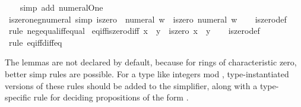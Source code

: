 \begin{isabellebody}
%
\isadelimproof
\ \ %
\endisadelimproof
%
\isatagproof
{}\isamarkupfalse%
\ {\isacharparenleft}{\kern0pt}simp\ add{\isacharcolon}{\kern0pt}\ numeral{\isacharunderscore}{\kern0pt}One{\isacharparenright}{\kern0pt}%
\endisatagproof
{\isafoldproof}%
%
\isadelimproof
\isanewline
%
\endisadelimproof
\isanewline
{}\isamarkupfalse%
\ iszero{\isacharunderscore}{\kern0pt}neg{\isacharunderscore}{\kern0pt}numeral\ {\isacharbrackleft}{\kern0pt}simp{\isacharbrackright}{\kern0pt}{\isacharcolon}{\kern0pt}\ {\isachardoublequoteopen}iszero\ {\isacharparenleft}{\kern0pt}{\isacharminus}{\kern0pt}\ numeral\ w{\isacharparenright}{\kern0pt}\ {\isasymlongleftrightarrow}\ iszero\ {\isacharparenleft}{\kern0pt}numeral\ w{\isacharparenright}{\kern0pt}{\isachardoublequoteclose}\isanewline
%
\isadelimproof
\ \ %
\endisadelimproof
%
\isatagproof
{}\isamarkupfalse%
\ iszero{\isacharunderscore}{\kern0pt}def\ \isamarkupfalse%
\ {\isacharparenleft}{\kern0pt}rule\ neg{\isacharunderscore}{\kern0pt}equal{\isacharunderscore}{\kern0pt}{}{\isacharunderscore}{\kern0pt}iff{\isacharunderscore}{\kern0pt}equal{\isacharparenright}{\kern0pt}%
\endisatagproof
{\isafoldproof}%
%
\isadelimproof
\isanewline
%
\endisadelimproof
\isanewline
{}\isamarkupfalse%
\ eq{\isacharunderscore}{\kern0pt}iff{\isacharunderscore}{\kern0pt}iszero{\isacharunderscore}{\kern0pt}diff{\isacharcolon}{\kern0pt}\ {\isachardoublequoteopen}x\ {\isacharequal}{\kern0pt}\ y\ {\isasymlongleftrightarrow}\ iszero\ {\isacharparenleft}{\kern0pt}x\ {\isacharminus}{\kern0pt}\ y{\isacharparenright}{\kern0pt}{\isachardoublequoteclose}\isanewline
%
\isadelimproof
\ \ %
\endisadelimproof
%
\isatagproof
{}\isamarkupfalse%
\ iszero{\isacharunderscore}{\kern0pt}def\ \isamarkupfalse%
\ {\isacharparenleft}{\kern0pt}rule\ eq{\isacharunderscore}{\kern0pt}iff{\isacharunderscore}{\kern0pt}diff{\isacharunderscore}{\kern0pt}eq{\isacharunderscore}{\kern0pt}{}{\isacharparenright}{\kern0pt}%
\endisatagproof
{\isafoldproof}%
%
\isadelimproof
%
\endisadelimproof
%
\begin{isamarkuptext}%
The  lemmas are not declared  by default,
  because for rings of characteristic zero, better simp rules are possible.
  For a type like integers mod , type-instantiated versions of these rules
  should be added to the simplifier, along with a type-specific rule for
  deciding propositions of the form .


\end{isamarkuptext}
\end{isabellebody}
